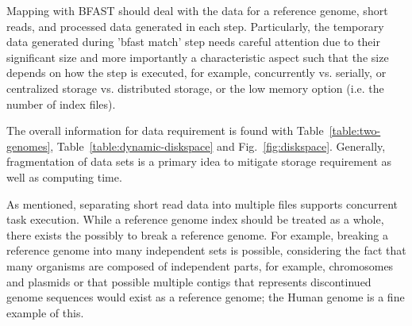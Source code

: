\documentclass{acm_proc_article-sp}
\begin{document}


Mapping with BFAST should deal with the data for a reference genome,
short reads, and processed data generated in each step.  Particularly,
the temporary data generated during 'bfast match' step needs  careful
attention due to their significant size and more importantly a
characteristic aspect such that the size depends on how the step is
executed, for example, concurrently vs. serially, or centralized
storage vs. distributed storage, or the low memory option (i.e. the
number of index files).
   
The overall information for data requirement is found with
Table~\ref{table:two-genomes}, Table~\ref{table:dynamic-diskspace} and
Fig.~\ref{fig:diskspace}. Generally, fragmentation of data sets is a
primary idea to mitigate  storage requirement as well as computing
time.  %

As mentioned, separating short read data into multiple files supports
concurrent task execution.  While a reference genome index should be
treated as a whole, there exists the possibly to break a reference
genome.  For example, breaking a reference genome into many
independent sets is possible, considering the fact that many organisms
are composed of independent parts, for example, chromosomes and
plasmids or that possible multiple contigs that represents
discontinued genome sequences would exist as a reference genome; the
Human genome is a fine example of this.
\end{document}
